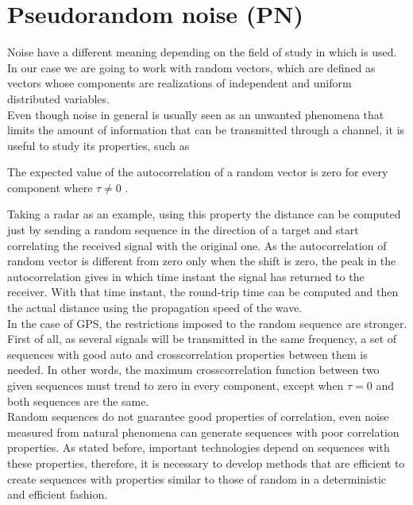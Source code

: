 \section{Pseudorandom noise (PN)}

Noise have a different meaning depending on the field of study in which is
used. In our case we are going to work with random vectors,
which are defined as vectors whose components are realizations of independent
and uniform distributed variables\cite{white_noise}.\\

Even though noise in general is usually seen as an unwanted phenomena that
limits the amount of information that can be transmitted through a
channel\cite{shannon_noise}, it is useful to study its properties, such as


\begin{property}
 The expected value of the autocorrelation of a random vector is zero for
 every component
  where $\tau \neq 0$ \cite{everett}.
\end{property}

Taking a radar as an example, using this property the distance can be computed
just by sending a random sequence in the direction of a target and start
correlating the received signal with the original one. As the autocorrelation
of random vector is different from zero only when the shift is zero, the peak
in the autocorrelation gives in which time instant the signal has returned to
the receiver. With that time instant, the round-trip time can be computed and then
the actual distance using the propagation speed of the wave.\\

In the case of GPS, the restrictions imposed to the random sequence are
stronger. First of all, as several signals will be transmitted in the same
frequency, a set of sequences with good auto and crosscorrelation
properties between them is needed. In other words, the maximum crosscorrelation
function between two given sequences must trend to zero in every component, except
when $\tau = 0$ and both sequences are the same.\\

Random sequences do not guarantee good properties of correlation, even noise
measured from natural phenomena can generate sequences with poor correlation
properties. As stated before, important technologies depend on sequences with
these properties, therefore, it is necessary to develop methods that are
efficient to create sequences with properties similar to those of random in a
deterministic and efficient fashion.\\

